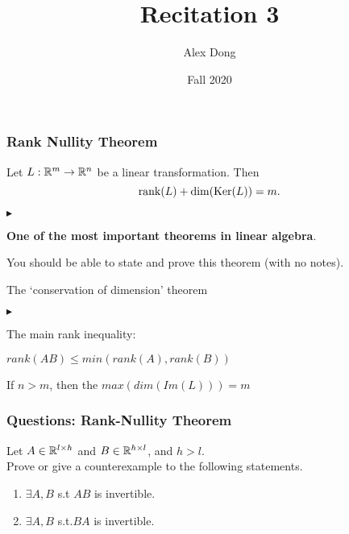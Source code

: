\documentclass{beamer}
\title{Recitation 3}
\author{Alex Dong}
\institute{CDS, NYU}
\date{Fall 2020}
\renewenvironment{itemize}
\renewenvironment{enumerate}%
{\begin{list}{\arabic{enumi}.}%
      {\setlength{\leftmargin}{2.5em}%
       \setlength{\itemsep}{-\parsep}%
       \setlength{\topsep}{-\parskip}%
       \usecounter{enumi}}%
 }{\end{list}}
\renewenvironment{itemize}%
{\begin{list}{$\blacktriangleright$}%
      {\setlength{\leftmargin}{2.5em}%
       \setlength{\itemsep}{-\parsep}%
       \setlength{\topsep}{-\parskip}%
       \usecounter{enumi}}%
 }{\end{list}}
\begin{document}
\frame{\titlepage} 
\begin{frame}
\frametitle{Rank Nullity Theorem}
\begin{theorem}
	Let $L: \mathbb{R}^m \to \mathbb{R}^n$ be a linear transformation. Then
	$$
	{{\rm rank}}(L) + {{\rm dim}}({{\rm Ker}}(L)) = m.
	$$
\end{theorem}
\begin{itemize}
\item \textbf{One of the most important theorems in linear algebra}.\\
\item You should be able to state and prove this theorem (with no notes).
\item The `conservation of dimension' theorem
\begin{itemize}
\item The main rank inequality:
\item $rank(AB)\leq min(rank(A),rank(B))$
\end{itemize}
\item If $n>m$, then the $max(dim(Im(L)))=m$

\end{itemize}
\end{frame}

\begin{frame}
\frametitle{Questions: Rank-Nullity Theorem}
Let $A\in \mathbb{R}^{l\times h}$ and $B\in \mathbb{R}^{h\times l}$, and $h>l$.\\
Prove or give a counterexample to the following statements.
\begin{enumerate}
\item $\exists A,B$ s.t $AB$ is invertible.
\item $\exists A,B$ s.t.$BA$ is invertible.
\end{enumerate}

\end{frame}
\end{document}
